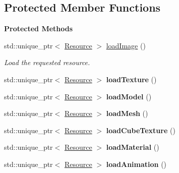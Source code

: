 \subsection*{Protected Member Functions}
\begin{Indent}\textbf{ Protected Methods}\par
\begin{DoxyCompactItemize}
\item 
std\+::unique\+\_\+ptr$<$ \mbox{\hyperlink{classrev_1_1_resource}{Resource}} $>$ \mbox{\hyperlink{classrev_1_1_load_process_a709d1f01ffd619787b2f497a76b20e33}{load\+Image}} ()
\begin{DoxyCompactList}\small\item\em Load the requested resource. \end{DoxyCompactList}\item 
\mbox{\label{classrev_1_1_load_process_a0ad30239bab2b7cfd14bb79d2ed09608}} 
std\+::unique\+\_\+ptr$<$ \mbox{\hyperlink{classrev_1_1_resource}{Resource}} $>$ {\bfseries load\+Texture} ()
\item 
\mbox{\label{classrev_1_1_load_process_ad10195aa98cf983b809f9bf0c6130d02}} 
std\+::unique\+\_\+ptr$<$ \mbox{\hyperlink{classrev_1_1_resource}{Resource}} $>$ {\bfseries load\+Model} ()
\item 
\mbox{\label{classrev_1_1_load_process_a7dd4ac6f7ac5cc2a6187783b2cfc86d2}} 
std\+::unique\+\_\+ptr$<$ \mbox{\hyperlink{classrev_1_1_resource}{Resource}} $>$ {\bfseries load\+Mesh} ()
\item 
\mbox{\label{classrev_1_1_load_process_aa4dcb74bf4377bb96523ff0af81957bf}} 
std\+::unique\+\_\+ptr$<$ \mbox{\hyperlink{classrev_1_1_resource}{Resource}} $>$ {\bfseries load\+Cube\+Texture} ()
\item 
\mbox{\label{classrev_1_1_load_process_acc71faa72287af46b0fe754b2e6d52af}} 
std\+::unique\+\_\+ptr$<$ \mbox{\hyperlink{classrev_1_1_resource}{Resource}} $>$ {\bfseries load\+Material} ()
\item 
\mbox{\label{classrev_1_1_load_process_a308da9f44a7fc5275637db3e02b00611}} 
std\+::unique\+\_\+ptr$<$ \mbox{\hyperlink{classrev_1_1_resource}{Resource}} $>$ {\bfseries load\+Animation} ()

\end{DoxyCompactItemize}
\end{Indent}
